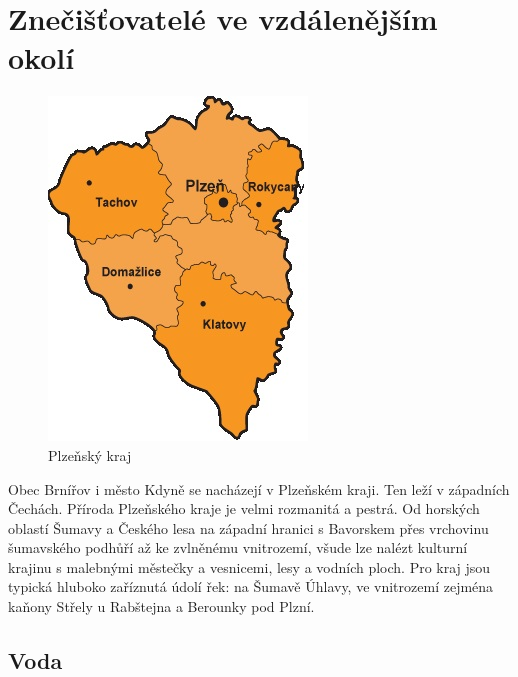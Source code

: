 \documentclass[12pt]{article} %
\begin{document}
\section{Znečišťovatelé ve vzdálenějším okolí}
\begin{figure}
	\vspace{-20pt}
	\begin{center}
		\includegraphics[scale=0.7]{plzensky_kraj.jpg}
	\end{center}
	\vspace{-10pt}
	\caption{Plzeňský kraj}
	\vspace{-20pt}
\end{figure}
Obec Brnířov i město Kdyně se nacházejí v Plzeňském kraji. Ten leží v západních Čechách. Příroda Plzeňského kraje je velmi rozmanitá a pestrá. Od horských oblastí Šumavy a Českého lesa na západní hranici s Bavorskem přes vrchovinu šumavského podhůří až ke zvlněnému vnitrozemí, všude lze nalézt kulturní krajinu s malebnými městečky a vesnicemi, lesy a vodních ploch. Pro kraj jsou typická hluboko zaříznutá údolí řek: na Šumavě Úhlavy, ve vnitrozemí zejména kaňony Střely u Rabštejna a Berounky pod Plzní.

\subsection{Voda}
\end{document}
